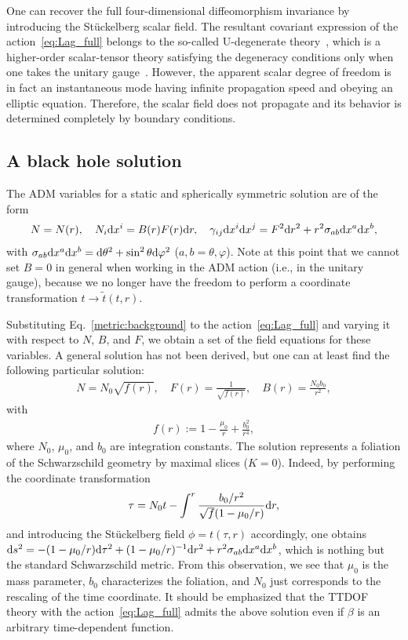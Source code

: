 \documentclass[aps,prd,preprintnumbers,superscriptaddress,nofootinbib,notitlepage]{revtex4-2}
\newcommand*{\D}{{\rm d}}
\begin{document}
One can recover the full four-dimensional diffeomorphism invariance
by introducing the St\"{u}ckelberg scalar field.
The resultant covariant expression of the action~\eqref{eq:Lag_full}
belongs to the so-called U-degenerate theory~\cite{Iyonaga:2021yfv},
which is a higher-order scalar-tensor theory satisfying
the degeneracy conditions only when one takes the unitary gauge~\cite{DeFelice:2018ewo}.
However, the apparent scalar degree of freedom is in fact an instantaneous mode having infinite propagation speed and obeying an elliptic equation.
Therefore, the scalar field does not propagate and its behavior is determined completely by boundary conditions.

 

\subsection{A black hole solution}

 
The ADM variables for a static and spherically symmetric solution are of the form
\begin{align}
    N=N(r),\quad N_i\D x^i=B(r)F(r)\D r,\quad \gamma_{ij}\D x^i\D x^j =
    F^2\D r^2+r^2\sigma_{ab}\D x^a\D x^b\label{metric:background},
\end{align}
with $\sigma_{ab}\D x^a\D x^b=\D\theta^2+\sin^2\theta\D\varphi^2$ ($a,b=\theta,\varphi$).
Note at this point that we cannot set $B=0$ in general when working in the ADM action (i.e., in the unitary gauge),
because we no longer have the freedom to perform a coordinate transformation $t\to \tilde t(t,r)$.


Substituting Eq.~\eqref{metric:background} to the action~\eqref{eq:Lag_full} and
varying it with respect to $N$, $B$, and $F$, we obtain a set of the field equations
for these variables.
A general solution has not been derived, but one can at least find
the following particular solution:
\begin{align}
    N=N_0\sqrt{f(r)},
    \quad 
    F(r)=\frac{1}{\sqrt{f(r)}},
    \quad 
    B(r)=\frac{N_0 b_0}{r^2},
\end{align}
with 
\begin{align}
    f(r):=1-\frac{\mu_0}{r}+\frac{b_0^2}{r^4},
\end{align}
where $N_0$, $\mu_0$, and $b_0$ are integration constants. 
The solution represents a foliation of the Schwarzschild geometry by maximal slices ($K=0$).
Indeed, by performing the coordinate transformation
\begin{align}
    \tau =N_0 t - \int^r\frac{b_0/r^2}{\sqrt{f}(1-\mu_0/r)}\D r,
    \label{Sch-coord}
\end{align}
and introducing the St\"{u}ckelberg field $\phi=t(\tau, r)$ accordingly,
one obtains $\D s^2=-(1-\mu_0/r)\D \tau^2+(1-\mu_0/r)^{-1}\D r^2+r^2\sigma_{ab}\D x^a\D x^b$,
which is nothing but the standard Schwarzschild metric.
From this observation, we see that $\mu_0$ is the mass parameter, $b_0$ characterizes the foliation, and $N_0$ just corresponds to the rescaling of the time coordinate.
It should be emphasized that the TTDOF theory with the action~\eqref{eq:Lag_full}
admits the above solution even if $\beta$ is an arbitrary time-dependent function.
\end{document}
